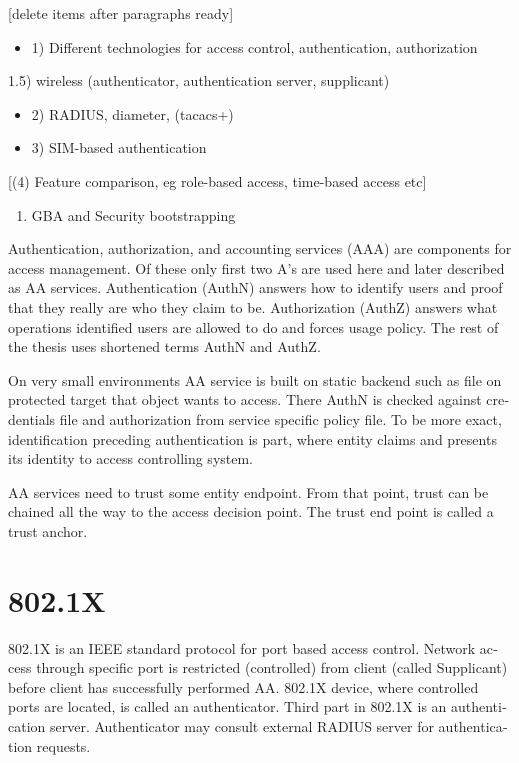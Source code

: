 \documentclass[12pt,a4paper,english]{tutthesis}
\begin{document}
\begin{otherlanguage}{english}
[delete items after paragraphs ready]
\begin{itemize}
\item 1) Different technologies for access control, authentication,
authorization
\end{itemize}
1.5) wireless (authenticator, authentication server, supplicant)
\begin{itemize}
\item 2) RADIUS, diameter, (tacacs+)
\item 3) SIM-based authentication
\end{itemize}
[(4) Feature comparison, eg role-based access, time-based access etc]
\begin{enumerate}
\item GBA and Security bootstrapping
\end{enumerate}

Authentication, authorization, and accounting services (AAA) are
components for access management. Of these only first two A's are used
here and later described as AA services. Authentication (AuthN)
answers how to identify users and proof that they really are
who they claim to be. Authorization (AuthZ) answers what operations
identified users are allowed to do and forces usage policy. The rest of the thesis uses
shortened terms AuthN and AuthZ.

On very small environments AA service is built on static backend such
as file on protected target that object wants to access. There AuthN
is checked against credentials file and authorization from service
specific policy file. 
To be more exact, identification preceding authentication is part,
where entity claims and presents its identity to 
access controlling system.

AA services need to trust some entity endpoint. From that point, trust
can be chained all the way to the access decision point. The trust end
point is called a trust anchor.


\section{802.1X}
\label{sec-2-1}

802.1X \cite{8021X} is an IEEE standard protocol for port based access
control.
 Network access through specific port is
restricted (controlled) from client (called Supplicant) before
client has successfully performed AA. 802.1X device, where controlled ports
are located, is called an authenticator. Third part in 802.1X is an
authentication server. Authenticator may consult external RADIUS
server for authentication requests. 



\end{otherlanguage}
\end{document}
